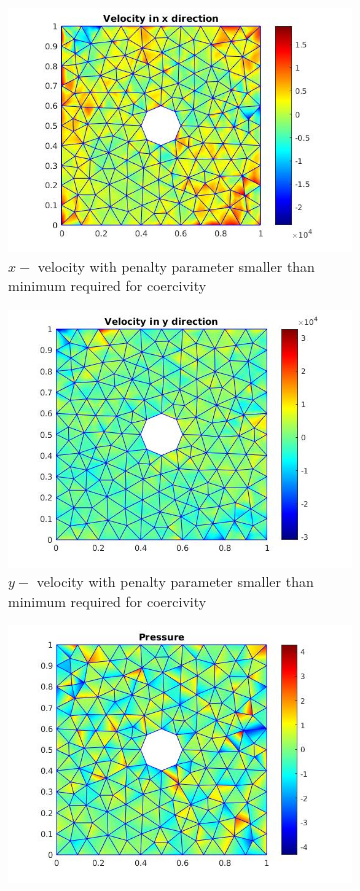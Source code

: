 \documentclass[a4paper,openany]{book}
\begin{document}
\begin{figure}
\begin{subfigure}{\textwidth}	
    \includegraphics[width=0.8\linewidth]{c11_unphysical_vx.jpg}
    \caption{$x-$ velocity with penalty parameter smaller than minimum required for coercivity}
    \label{x_vel_stoke_c11_low}
\end{subfigure}
\begin{subfigure}{\textwidth}	
    \includegraphics[width=0.8\linewidth]{c11_unphysical_vy.jpg}
    \caption{$y-$ velocity with penalty parameter smaller than minimum required for coercivity}
     \label{y_vel_stoke_c11_low}
\end{subfigure}
\begin{subfigure}{\textwidth}	
    \includegraphics[width=0.8\linewidth]{c11_unphysical_pressure.jpg}

\end{subfigure}
\end{figure}
\end{document}
